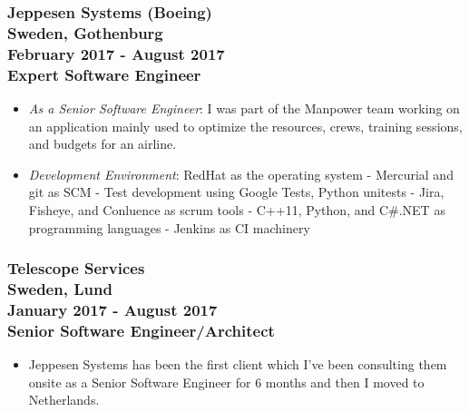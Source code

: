 \documentclass[10pt,a4paper]{article}
\begin{document}
\subsubsection{{\large Jeppesen Systems (Boeing)} \\ 
\textnormal{Sweden, Gothenburg} \\ 
\textnormal{February 2017 - August 2017} \\ 
{Expert Software Engineer}}
  \setlength{\leftskip}{0.5cm}
  \setlength{\rightskip}{1cm}
  \begin{itemize}
    \setlength{\rightskip}{1cm}
    \setlength\itemsep{0em}
    \item \textit {As a Senior Software Engineer}: I was part of the Manpower team working on an application mainly used to optimize the resources, crews, training sessions, and budgets for an airline.
    \item \textit {Development Environment}: RedHat as the operating system - Mercurial and git as SCM - Test development using Google Tests, Python unitests - Jira, Fisheye, and Conluence as scrum tools - C++11, Python, and C\#.NET as programming languages - Jenkins as CI machinery
  \end{itemize}
  \setlength{\leftskip}{0pt}
  \setlength{\rightskip}{0cm}
  
\subsubsection{{\large Telescope Services} \\ 
\textnormal{Sweden, Lund} \\ 
\textnormal{January 2017 - August 2017} \\ 
{Senior Software Engineer/Architect}}
  \setlength{\leftskip}{0.5cm}
  \setlength{\rightskip}{1cm}
  \begin{itemize}
    \setlength{\rightskip}{1cm}
    \setlength\itemsep{0em}
    \item Jeppesen Systems has been the first client which I've been consulting them onsite as a Senior Software Engineer for 6 months and then I moved to Netherlands.
  \end{itemize}
  \setlength{\leftskip}{0pt}
  \setlength{\rightskip}{0cm}
  
\end{document}
